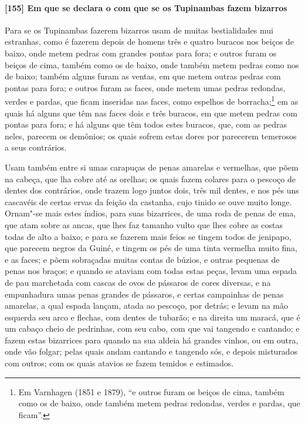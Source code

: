 \begin{linenumbers}
\paragraph{[155] Em que se declara o com que se os Tupinambas fazem bizarros}\quad
Para se os Tupinambas fazerem bizarros usam de muitas bestialidades mui estranhas, como é
fazerem depois de homens três e quatro buracos nos beiços de baixo, onde metem pedras com
grandes pontas para fora; e outros furam os beiços de cima, também como os de baixo, onde
também metem pedras como nos de baixo; também alguns furam as ventas, em que metem outras
pedras com pontas para fora; e outros furam as faces, onde metem umas pedras redondas,
verdes e pardas, que ficam inseridas nas faces, como espelhos de borracha;\footnote{ Em
Varnhagen (1851 e 1879), ``e outros furam os beiços de cima, também como os de baixo, onde
também metem pedras redondas, verdes e pardas, que ficam''.} em as quais há alguns que têm
nas faces dois e três buracos, em que metem pedras com pontas para fora; e há alguns que
têm todos estes buracos, que, com as pedras neles, parecem os demônios; os quais sofrem
estas dores por parecerem temerosos a seus contrários.

Usam também entre si umas carapuças de penas amarelas e vermelhas, que põem na cabeça, que
lha cobre até as orelhas; os quais fazem colares para o pescoço de dentes dos contrários,
onde trazem logo juntos dois, três mil dentes, e nos pés uns cascavéis de certas ervas da
feição da castanha, cujo tinido se ouve muito longe. Ornam"-se mais estes índios, para suas
bizarrices, de uma roda de penas de ema, que atam sobre as ancas, que lhes faz tamanho
vulto que lhes cobre as costas todas de alto a baixo; e para se fazerem mais feios se
tingem todos de jenipapo, que parecem negros da Guiné, e tingem os pés de uma tinta
vermelha muito fina, e as faces; e põem sobraçadas muitas contas de búzios, e outras
pequenas de penas nos braços; e quando se ataviam com todas estas peças, levam uma espada
de pau marchetada com cascas de ovos de pássaros de cores diversas, e na empunhadura umas
penas grandes de pássaros, e certas campainhas de penas amarelas, a qual espada lançam,
atada ao pescoço, por detrás; e levam na mão esquerda seu arco e flechas, com dentes de
tubarão; e na direita um maracá, que é um cabaço cheio de pedrinhas, com seu cabo, com que
vai tangendo e cantando; e fazem estas bizarrices para quando na sua aldeia há grandes
vinhos, ou em outra, onde vão folgar; pelas quais andam cantando e tangendo sós, e depois
misturados com outros; com os quais atavios se fazem temidos e estimados.


\end{linenumbers}
